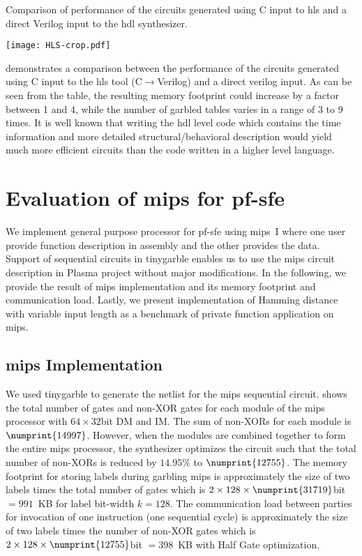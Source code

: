 \begin{table}[t]
\centering
\caption{Comparison of performance of the circuits generated using C input to \acrshort{hls} and a direct Verilog input to the \acrshort{hdl} synthesizer.}
\label{table:hls}
\texttt{[image: HLS-crop.pdf]}
\end{table}

 demonstrates a comparison between the performance of the circuits generated using C input to the \acrshort{hls} tool (C$\rightarrow$Verilog) and a direct \gls{verilog} input.
As can be seen from the table, the resulting memory footprint could increase by a factor between 1 and 4, while the number of garbled tables varies in a range of 3 to 9 times.
It is well known that writing the \acrshort{hdl} level code which contains the time information and more detailed structural/behavioral description would yield much more efficient circuits than the code written in a higher level language.

\section{Evaluation of \gls{mips} for \acrshort{pf-sfe}}
We implement general purpose processor for \acrshort{pf-sfe} using \gls{mips}~I where one user provide function description in assembly and the other provides the data.
Support of sequential circuits in \gls{tinygarble} enables us to use the \gls{mips} circuit description in Plasma project \cite{rhoads2006plasma} without major modifications.
In the following, we provide the result of \gls{mips} implementation and its memory footprint and communication load.
Lastly, we present implementation of Hamming distance with variable input length as a benchmark of private function application on \gls{mips}.

\subsection{\gls{mips} Implementation}
We used \gls{tinygarble} to generate the \gls{netlist} for the \gls{mips} sequential circuit.
 shows the total number of gates and non-XOR gates for each module of the \gls{mips} processor with $64\times32$bit DM and IM.
The sum of non-XORs for each module is $\numprint{14997}$.
However, when the modules are combined together to form the entire \gls{mips} processor, the synthesizer optimizes the circuit such that the total number of non-XORs is reduced by $14.95\%$ to $\numprint{12755}$.
The memory footprint for storing labels during garbling \gls{mips} is approximately the size of two labels times the total number of gates which is $2 \times 128 \times \numprint{31719}$bit $=991$~KB for label bit-width $k=128$.
The communication load between parties for invocation of one instruction (one sequential cycle) is approximately the size of two labels times the number of non-XOR gates which is $2\times 128 \times \numprint{12755}$bit $=398$~KB with Half Gate optimization.

